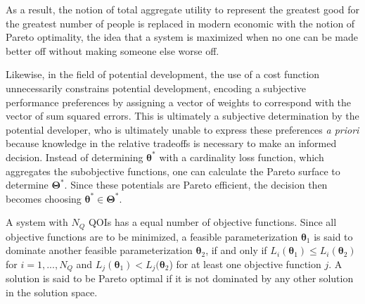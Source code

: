 As a result, the notion of total aggregate utility to represent the greatest good for the greatest number of people is replaced in modern economic with the notion of Pareto optimality, the idea that a system is maximized when no one can be made better off without making someone else worse off\cite{mathur1991_pareto}.

Likewise, in the field of potential development, the use of a cost function unnecessarily constrains potential development, encoding a subjective performance preferences by assigning a vector of weights to correspond with the vector of sum squared errors.  This is ultimately a subjective determination by the potential developer, who is ultimately unable to express these preferences \emph{a priori} because knowledge in the relative tradeoffs is necessary to make an informed decision.  Instead of determining $\bm{\theta}^*$ with a cardinality loss function, which aggregates the subobjective functions, one can calculate the Pareto surface to determine $\bm{\Theta}^*$.  Since these potentials are Pareto efficient, the decision then becomes choosing $\bm{\theta}^* \in \bm{\Theta}^*$.

A system with $N_Q$ QOIs has a equal number of objective functions.  Since all objective functions are to be minimized, a feasible parameterization $\bm{\theta}_1$ is said to dominate another feasible parameterization $\bm{\theta}_2$, if and only if $L_i(\bm{\theta}_1) \leq L_i(\bm{\theta}_2)$ for $i = 1,...,N_Q$ and $L_j(\bm{\theta}_1) < L_j(\bm{\theta}_2$) for at least one objective function $j$.  A solution is said to be Pareto optimal if it is not dominated by any other solution in the solution space.

